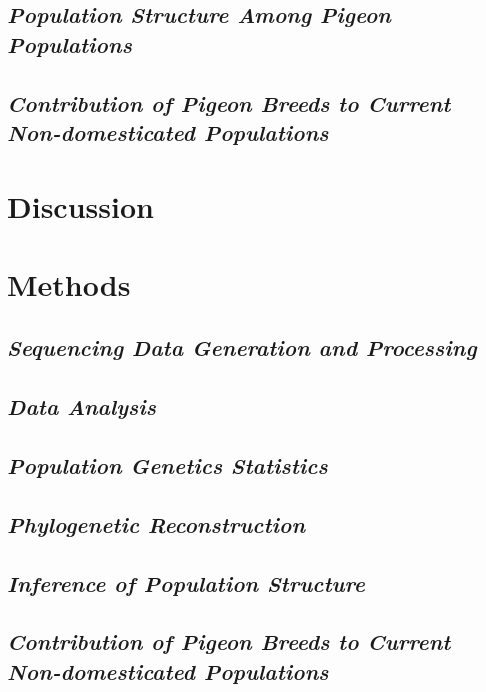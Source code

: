 \documentclass[a4paper]{article}
\begin{document}
\subsection{\textit{Population Structure Among Pigeon Populations}}

\subsection{\textit{Contribution of Pigeon Breeds to Current Non-domesticated Populations}}

\section{Discussion}

\section{Methods}

\subsection{\textit{Sequencing Data Generation and Processing}}

\subsection{\textit{Data Analysis}}

\subsection{\textit{Population Genetics Statistics}}

\subsection{\textit{Phylogenetic Reconstruction}}

\subsection{\textit{Inference of Population Structure}}

\subsection{\textit{Contribution of Pigeon Breeds to Current Non-domesticated Populations}}




\end{document}
